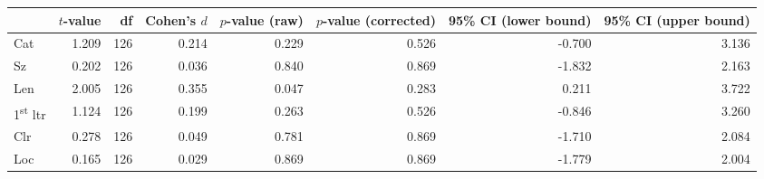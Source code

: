 \begin{tabular}{lrrrrrrr}
\toprule
{} & $t$-value &  df & Cohen's $d$ & $p$-value (raw) & $p$-value (corrected) & 95\% CI (lower bound) & 95\% CI (upper bound) \\
\midrule
Cat                       &     1.209 & 126 &       0.214 &           0.229 &                 0.526 &                -0.700 &                 3.136 \\
Sz                        &     0.202 & 126 &       0.036 &           0.840 &                 0.869 &                -1.832 &                 2.163 \\
Len                       &     2.005 & 126 &       0.355 &           0.047 &                 0.283 &                 0.211 &                 3.722 \\
1\textsuperscript{st} ltr &     1.124 & 126 &       0.199 &           0.263 &                 0.526 &                -0.846 &                 3.260 \\
Clr                       &     0.278 & 126 &       0.049 &           0.781 &                 0.869 &                -1.710 &                 2.084 \\
Loc                       &     0.165 & 126 &       0.029 &           0.869 &                 0.869 &                -1.779 &                 2.004 \\
\bottomrule
\end{tabular}
